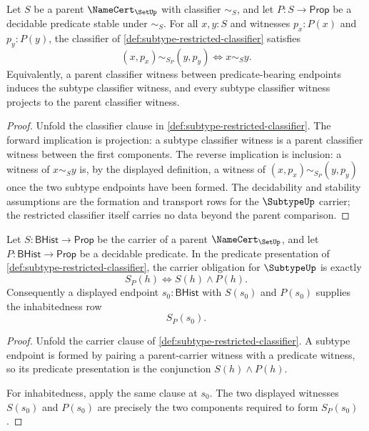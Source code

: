\begin{theorem}
\label{thm:subtype-classifier-reflects-parent-classifier}
Let $S$ be a parent $\NameCert_{\SetUp}$ with classifier $\sim_S$, and let
$P:S\to\mathsf{Prop}$ be a decidable predicate stable under $\sim_S$. For all
$x,y:S$ and witnesses $p_x:P(x)$ and $p_y:P(y)$, the classifier of
\autoref{def:subtype-restricted-classifier} satisfies
$$
(x,p_x)\sim_{S_P}(y,p_y)
\Longleftrightarrow
x\sim_S y.
$$
Equivalently, a parent classifier witness between predicate-bearing endpoints
induces the subtype classifier witness, and every subtype classifier witness
projects to the parent classifier witness.
\end{theorem}
\begin{proof}
Unfold the classifier clause in \autoref{def:subtype-restricted-classifier}.
The forward implication is projection: a subtype classifier witness is a parent
classifier witness between the first components. The reverse implication is
inclusion: a witness of $x\sim_S y$ is, by the displayed definition, a witness
of $(x,p_x)\sim_{S_P}(y,p_y)$ once the two subtype endpoints have been formed.
The decidability and stability assumptions are the formation and transport rows
for the $\SubtypeUp$ carrier; the restricted classifier itself carries no data
beyond the parent comparison.
\end{proof}

\begin{theorem}
\label{thm:subtype-carrier-obligation-row}
Let $S:\mathsf{BHist}\to\mathsf{Prop}$ be the carrier of a parent $\NameCert_{\SetUp}$, and let $P:\mathsf{BHist}\to\mathsf{Prop}$ be a decidable predicate. In the predicate presentation of \autoref{def:subtype-restricted-classifier}, the carrier obligation for $\SubtypeUp$ is exactly
$$
S_P(h)\Longleftrightarrow S(h)\land P(h).
$$
Consequently a displayed endpoint $s_0:\mathsf{BHist}$ with $S(s_0)$ and $P(s_0)$ supplies the inhabitedness row
$$
S_P(s_0).
$$
\end{theorem}
\begin{proof}
Unfold the carrier clause of \autoref{def:subtype-restricted-classifier}. A subtype endpoint is formed by pairing a parent-carrier witness with a predicate witness, so its predicate presentation is the conjunction $S(h)\land P(h)$.

For inhabitedness, apply the same clause at $s_0$. The two displayed witnesses $S(s_0)$ and $P(s_0)$ are precisely the two components required to form $S_P(s_0)$.
\end{proof}

